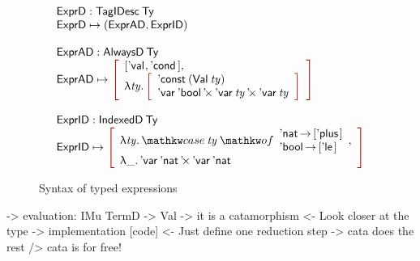 \begin{figure}

\[\stk{
\stk{
\HExprD : \TagIDesc{\Ty} \\
\HExprD \mapsto ( \HExprAD , \HExprID ) \\
} \\
\\
\stk{
\HExprAD : \ATagIDesc{\Ty} \\
\HExprAD \mapsto \bigRedBracket{
                 \begin{array}{l}
                   {[\Eval{\!}, \Econd{\!}{\!}{\!}\!\,]} \red{,} \\
                   \LAM{\V{ty}}
                   \bigRedBracket{
                   \begin{array}{l}
                   \DConst{(\Val{\V{ty}})} \\
                   \DProd{\DVar{\Ebool}}{\DProd{\DVar{\V{ty}}}{\DVar{\V{ty}}}}
                   \end{array}
                   }
                 \end{array}
                 }
\\
\\
} 
\\
\stk{
\HExprID : \ITagIDesc{\Ty} \\
\HExprID \mapsto \bigRedBracket{
                 \begin{array}{l}
                   \LAM{\V{ty}} \case{\V{ty}}{\Enat \To {[\Eplus{\!}{\!}\!\,]} \\ \Ebool \To {[\Ele{\!}{\!}\!\,]}} \red{,} \\
                   \LAM{\_} \DProd{\DVar{\Enat}}{\DVar{\Enat}} 
                   \end{array}
                   }
}
}\]

\caption{Syntax of typed expressions}
\label{fig:hexpr-full}

\end{figure}

\begin{wstructure}
    -> evaluation: IMu TermD -> Val
        -> it is a catamorphism
            <- Look closer at the type
        -> implementation [code]
            <- Just define one reduction step
            -> cata does the rest
                /> cata is for free!
\end{wstructure}

\newcommand{\evalH}{\F{eval}_{\green{\Downarrow}}}
\newcommand{\evalOne}{\F{eval}_{\green{\downarrow}}}

